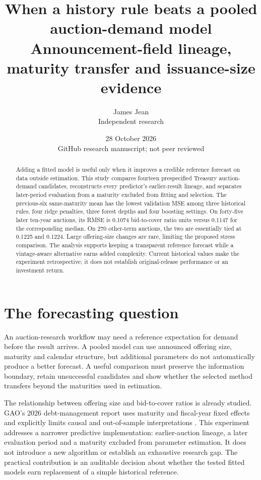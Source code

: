 \documentclass[11pt]{article}
\title{When a history rule beats a pooled auction-demand model\\\large Announcement-field lineage, maturity transfer and issuance-size evidence}
\author{James Jean\\Independent research}
\date{28 October 2026\\GitHub research manuscript; not peer reviewed}
\begin{document}
\maketitle
\begin{abstract}
Adding a fitted model is useful only when it improves a credible reference forecast on data outside estimation. This study compares fourteen prespecified Treasury auction-demand candidates, reconstructs every predictor's earlier-result lineage, and separates later-period evaluation from a maturity excluded from fitting and selection. The previous-six same-maturity mean has the lowest validation MSE among three historical rules, four ridge penalties, three forest depths and four boosting settings. On forty-five later ten-year auctions, its RMSE is 0.1074 bid-to-cover ratio units versus 0.1147 for the corresponding median. On 270 other-term auctions, the two are essentially tied at 0.1225 and 0.1224. Large offering-size changes are rare, limiting the proposed stress comparison. The analysis supports keeping a transparent reference forecast while a vintage-aware alternative earns added complexity. Current historical values make the experiment retrospective; it does not establish original-release performance or an investment return.
\end{abstract}
\section{The forecasting question}
An auction-research workflow may need a reference expectation for demand before the result arrives. A pooled model can use announced offering size, maturity and calendar structure, but additional parameters do not automatically produce a better forecast. A useful comparison must preserve the information boundary, retain unsuccessful candidates and show whether the selected method transfers beyond the maturities used in estimation.

The relationship between offering size and bid-to-cover ratios is already studied. GAO's 2026 debt-management report uses maturity and fiscal-year fixed effects and explicitly limits causal and out-of-sample interpretations \cite{gao}. This experiment addresses a narrower predictive implementation: earlier-auction lineage, a later evaluation period and a maturity excluded from parameter estimation. It does not introduce a new algorithm or establish an exhaustive research gap. The practical contribution is an auditable decision about whether the tested fitted models earn replacement of a simple historical reference.
\end{document}
